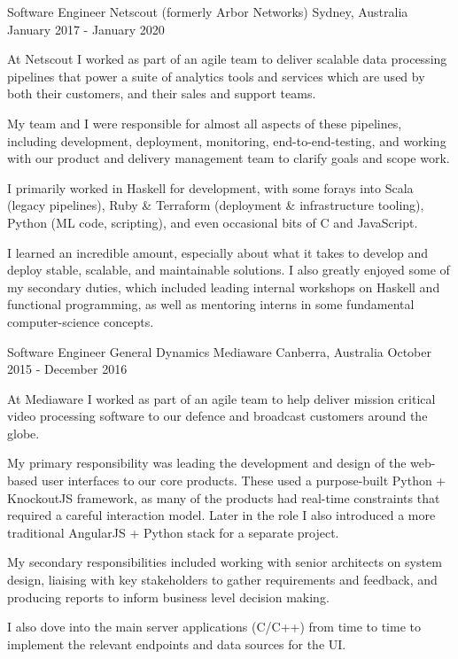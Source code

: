 \begin{cventries}
\cventry
{Software Engineer} %
{Netscout (formerly Arbor Networks)} %
{Sydney, Australia} %
{January 2017 - January 2020 } %
{ %
\begin{cvitems}
\item {At Netscout I worked as part of an agile team to deliver scalable data processing pipelines that power a suite of analytics tools and services which are used by both their customers, and their sales and support teams.}
\item {My team and I were responsible for almost all aspects of these pipelines, including development, deployment, monitoring, end-to-end-testing, and working with our product and delivery management team to clarify goals and scope work.}
\item {I primarily worked in Haskell for development, with some forays into Scala (legacy pipelines), Ruby \& Terraform (deployment \& infrastructure tooling), Python (ML code, scripting), and even occasional bits of C and JavaScript.}
\item {I learned an incredible amount, especially about what it takes to develop and deploy stable, scalable, and maintainable solutions. I also greatly enjoyed some of my secondary duties, which included leading internal workshops on Haskell and functional programming, as well as mentoring interns in some fundamental computer-science concepts.}
\end{cvitems}
\vspace{2.0mm}
}


\cventry
{Software Engineer} %
{General Dynamics Mediaware} %
{Canberra, Australia} %
{October 2015 - December 2016} %
{ %
\begin{cvitems}
  \item {At Mediaware I worked as part of an agile team to help deliver mission critical video processing software to our defence and broadcast customers around the globe.}
  \item {My primary responsibility was leading the development and design of the web-based user interfaces to our core products. These used a purpose-built Python + KnockoutJS }framework, as many of the products had real-time constraints that required a careful interaction model. Later in the role I also introduced a more traditional AngularJS + Python stack for a separate project.
  \item {My secondary responsibilities included working with senior architects on system design, liaising with key stakeholders to gather requirements and feedback, and producing }reports to inform business level decision making.
  \item {I also dove into the main server applications (C/C++) from time to time to implement the relevant endpoints and data sources for the UI.}
\end{cvitems}
\vspace{2.0mm}
}


\end{cventries}
